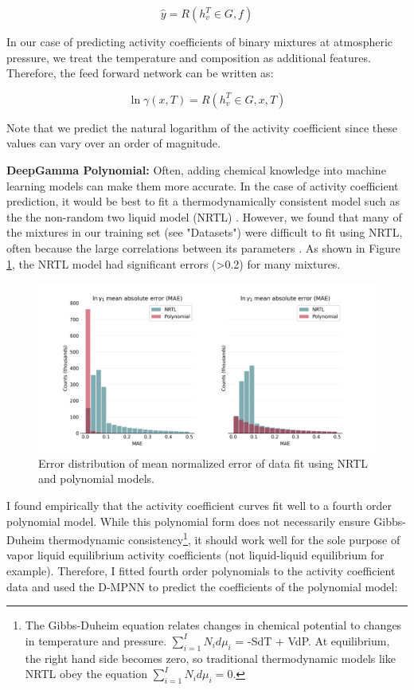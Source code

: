 \begin{equation}
    \hat y = R(h_v^T \in G, f)
\end{equation}

In our case of predicting activity coefficients of binary mixtures at atmospheric pressure, we treat the temperature and composition as additional features. Therefore, the feed forward network can be written as:

\begin{equation}
   \ln \gamma(x,T)= R(h_v^T \in G, x, T)
\end{equation}

Note that we predict the natural logarithm of the activity coefficient since these values can vary over an order of magnitude.

\noindent
\textbf{DeepGamma Polynomial:} Often, adding chemical knowledge into machine learning models can make them more accurate. In the case of activity coefficient prediction, it would be best to fit a thermodynamically consistent model such as the the non-random two liquid model (NRTL) \cite{Renon1968}. However, we found that many of the mixtures in our training set (see "Datasets") were difficult to fit using NRTL, often because the large correlations between its parameters \cite{Holler2019}. As shown in Figure \ref{fig:mnae_distribution}, the NRTL model had significant errors (>0.2) for many mixtures.

\begin{figure}
    \centering
    \includegraphics[width=\textwidth]{gfx/Chapter07/error_distribution_fitting_cosmo.png}
    \caption{Error distribution of mean normalized error of data fit using NRTL and polynomial models.}
    \label{fig:mnae_distribution}
\end{figure}

I found empirically that the activity coefficient curves fit well to a fourth order polynomial model. While this  polynomial form does not necessarily ensure Gibbs-Duheim thermodynamic consistency\footnote{The Gibbs-Duheim equation relates changes in chemical potential to changes in temperature and pressure. $\sum_{i=1}^I N_i d\mu_i$ = -SdT + VdP. At equilibrium, the right hand side becomes zero, so traditional thermodynamic models like NRTL obey the equation $\sum_{i=1}^I N_i d\mu_i=0$.}, it should work well for the sole purpose of vapor liquid equilibrium activity coefficients (not liquid-liquid equilibrium for example). Therefore, I fitted fourth order polynomials to the activity coefficient data and used the D-MPNN to predict the coefficients of the polynomial model:

